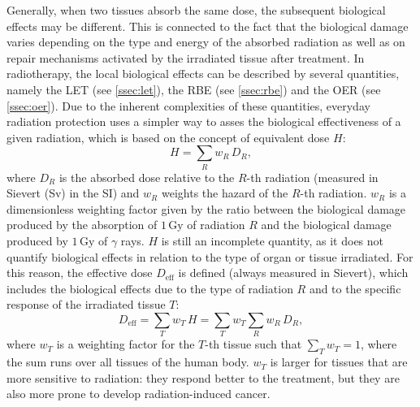 Generally, when two tissues absorb the same dose, the subsequent biological effects may be different. This is connected to the fact that the biological damage varies depending on the type and energy of the absorbed radiation as well as on repair mechanisms activated by the irradiated tissue after treatment. In radiotherapy, the local biological effects can be described by several quantities, namely the LET (see \autoref{ssec:let}), the RBE (see \autoref{ssec:rbe}) and the OER (see \autoref{ssec:oer}). Due to the inherent complexities of these quantities, everyday radiation protection uses a simpler way to asses the biological effectiveness of a given radiation, which is based on the concept of equivalent dose $H$:
\begin{equation}
	H=\sum_{R}w_R\,D_{R},
	\label{eq:dose_eq}
\end{equation}
where $D_{R}$ is the absorbed dose relative to the $R$-th radiation (measured in Sievert (Sv) in the SI) and $w_R$ weights the hazard of the $R$-th radiation. $w_R$ is a dimensionless weighting factor given by the ratio between the biological damage produced by the absorption of $1\,\mathrm{Gy}$ of radiation $R$ and the biological damage produced by $1\,\mathrm{Gy}$ of $\gamma$ rays. $H$ is still an incomplete quantity, as it does not quantify biological effects in relation to the type of organ or tissue irradiated. For this reason, the effective dose $D_\text{eff}$ is defined (always measured in Sievert), which includes the biological effects due to the type of radiation $R$ and to the specific response of the irradiated tissue $T$:
\begin{equation}
	D_\text{eff}=\sum_{T}w_T\,H=\sum_{T}w_T\sum_{R}w_R\,D_{R},
	\label{eq:dose_eff}
\end{equation}
where $w_T$ is a weighting factor for the $T$-th tissue such that $\sum_{T}w_T=1$, where the sum runs over all tissues of the human body. $w_T$ is larger for tissues that are more sensitive to radiation: they respond better to the treatment, but they are also more prone to develop radiation-induced cancer.
